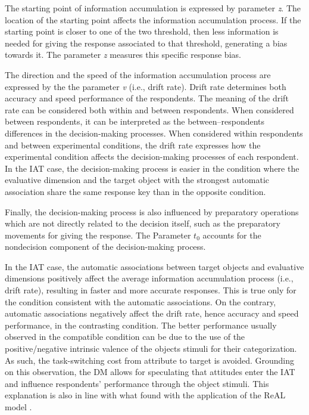 \documentclass[12pt]{book}
\begin{document}
The starting point of information accumulation is expressed by parameter \emph{z}. The location of the starting point affects the information accumulation process. If the starting point is closer to one of the two threshold, then less information is needed for giving the response associated to that threshold, generating a bias towards it. The parameter \emph{z} measures this specific response bias.

The direction and the speed of the information accumulation process are expressed by the the parameter \emph{v} (i.e., drift rate). 
Drift rate determines both accuracy and speed performance of the respondents. 
The meaning of the drift rate can be considered both within and between respondents. When considered between respondents, it can be interpreted as the between--respondents differences in the decision-making processes. 
When considered within respondents and between experimental conditions, the drift rate expresses how the experimental condition  affects the decision-making processes of each respondent. In the IAT case, the decision-making process is easier in the condition where the evaluative dimension and the target object with the strongest automatic association share the same response key than in the opposite condition. 

Finally, the decision-making process is also influenced by preparatory operations which are not directly related to the decision itself, such as the preparatory movements for giving the response. 
The Parameter $t_0$ accounts for the nondecision component of the decision-making process.  

In the IAT case, the automatic associations between target objects and evaluative dimensions positively affect the average information accumulation process (i.e., drift rate), resulting in faster and more accurate responses. This is true only for the condition consistent with the automatic associations. On the contrary, automatic associations negatively affect the drift rate, hence accuracy and speed performance, in the contrasting condition.
The better performance usually observed in the compatible condition can be due to the use of the positive/negative intrinsic valence of the objects stimuli for their categorization. As such, the task-switching cost from attribute to target is avoided. 
Grounding on this observation, the DM allows for speculating that attitudes enter the IAT and influence respondents' performance through the object stimuli. This explanation is also in line with what found with the application of the ReAL model \cite{Meissner2013}.
\end{document}
